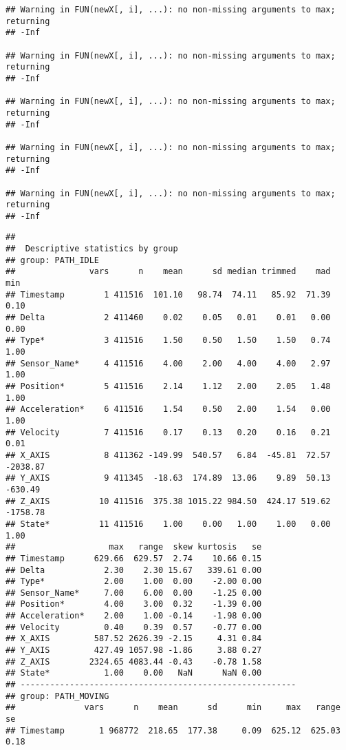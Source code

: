 \documentclass[]{article}
\begin{document}
\begin{verbatim}
## Warning in FUN(newX[, i], ...): no non-missing arguments to max; returning
## -Inf

## Warning in FUN(newX[, i], ...): no non-missing arguments to max; returning
## -Inf

## Warning in FUN(newX[, i], ...): no non-missing arguments to max; returning
## -Inf

## Warning in FUN(newX[, i], ...): no non-missing arguments to max; returning
## -Inf

## Warning in FUN(newX[, i], ...): no non-missing arguments to max; returning
## -Inf
\end{verbatim}

\begin{verbatim}
## 
##  Descriptive statistics by group 
## group: PATH_IDLE
##               vars      n    mean      sd median trimmed    mad      min
## Timestamp        1 411516  101.10   98.74  74.11   85.92  71.39     0.10
## Delta            2 411460    0.02    0.05   0.01    0.01   0.00     0.00
## Type*            3 411516    1.50    0.50   1.50    1.50   0.74     1.00
## Sensor_Name*     4 411516    4.00    2.00   4.00    4.00   2.97     1.00
## Position*        5 411516    2.14    1.12   2.00    2.05   1.48     1.00
## Acceleration*    6 411516    1.54    0.50   2.00    1.54   0.00     1.00
## Velocity         7 411516    0.17    0.13   0.20    0.16   0.21     0.01
## X_AXIS           8 411362 -149.99  540.57   6.84  -45.81  72.57 -2038.87
## Y_AXIS           9 411345  -18.63  174.89  13.06    9.89  50.13  -630.49
## Z_AXIS          10 411516  375.38 1015.22 984.50  424.17 519.62 -1758.78
## State*          11 411516    1.00    0.00   1.00    1.00   0.00     1.00
##                   max   range  skew kurtosis   se
## Timestamp      629.66  629.57  2.74    10.66 0.15
## Delta            2.30    2.30 15.67   339.61 0.00
## Type*            2.00    1.00  0.00    -2.00 0.00
## Sensor_Name*     7.00    6.00  0.00    -1.25 0.00
## Position*        4.00    3.00  0.32    -1.39 0.00
## Acceleration*    2.00    1.00 -0.14    -1.98 0.00
## Velocity         0.40    0.39  0.57    -0.77 0.00
## X_AXIS         587.52 2626.39 -2.15     4.31 0.84
## Y_AXIS         427.49 1057.98 -1.86     3.88 0.27
## Z_AXIS        2324.65 4083.44 -0.43    -0.78 1.58
## State*           1.00    0.00   NaN      NaN 0.00
## -------------------------------------------------------- 
## group: PATH_MOVING
##              vars      n    mean      sd      min     max   range   se
## Timestamp       1 968772  218.65  177.38     0.09  625.12  625.03 0.18

\end{verbatim}
\end{document}
